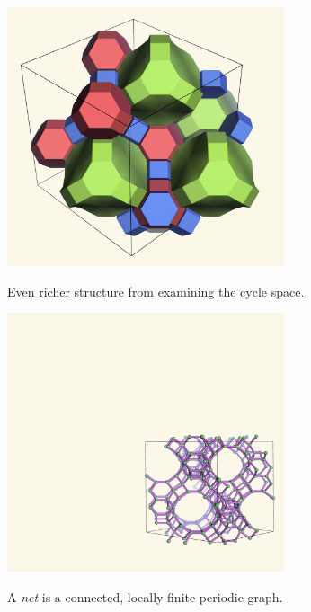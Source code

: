 \documentclass{beamer}
\begin{document}
\begin{frame}
  \begin{center}
    \includegraphics[height=3in]{fau-tiling-new}

    Even richer structure from examining the cycle space.
  \end{center}
\end{frame}

\begin{frame}
  \begin{center}
    \includegraphics[height=3in]{fau-111}

    A {\em net} is a connected, locally finite periodic graph.
  \end{center}
\end{frame}
\end{document}
